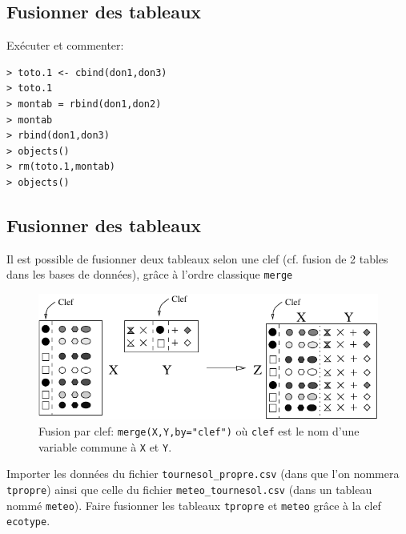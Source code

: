 \documentclass[a4paper,10pt,french]{article}
\begin{document}
\subsection{Fusionner des tableaux}
Exécuter et commenter:
\begin{verbatim}
> toto.1 <- cbind(don1,don3)
> toto.1
> montab = rbind(don1,don2)
> montab
> rbind(don1,don3)
> objects()
> rm(toto.1,montab)
> objects()
\end{verbatim}
\subsection{Fusionner des tableaux}
Il est possible de fusionner deux tableaux selon une clef (cf. fusion
de 2 tables dans les bases de données), grâce à l'ordre classique
\texttt{merge}

\begin{figure}[H]
  \centering
\includegraphics[width=\textwidth]{bind}
  \caption{Fusion par clef: \texttt{merge(X,Y,by="clef")} où \texttt{clef} est le nom d'une variable commune à \texttt{X} et \texttt{Y}.}
  \label{fig:merge}
\end{figure}
Importer les données du fichier \texttt{tournesol\string_propre.csv}
(dans que l'on nommera \texttt{tpropre}) ainsi que celle du fichier 
\texttt{meteo\string_tournesol.csv} (dans un tableau nommé \texttt{meteo}\label{sec:importation}).
Faire fusionner les tableaux \texttt{tpropre} et \texttt{meteo}
grâce à la clef \texttt{ecotype}.
\end{document}
